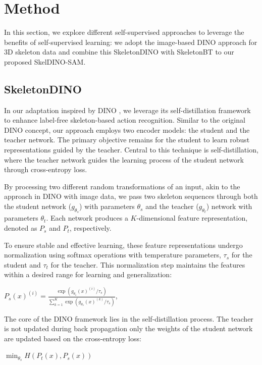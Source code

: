 \section{Method}
In this section, we explore different self-supervised approaches to leverage the benefits of self-supervised learning: we adopt the image-based DINO \cite{caron2021emerging} approach for 3D skeleton data and combine this SkeletonDINO with SkeletonBT \cite{zhou2023self} to our proposed SkelDINO-SAM. 

\subsection{SkeletonDINO}
In our adaptation inspired by DINO \cite{caron2021emerging}, we leverage its self-distillation framework to enhance label-free skeleton-based action recognition. 
Similar to the original DINO concept, our approach employs two encoder models: the student and the teacher network. The primary objective remains for the student to learn robust representations guided by the teacher. Central to this technique is self-distillation, where the teacher network guides the learning process of the student network through cross-entropy loss.

By processing two different random transformations of an input, akin to the approach in DINO with image data, we pass two skeleton sequences through both the student network ($g_{\theta_s}$) with parameters $\theta_s$ and the teacher ($g_{\theta_t}$) network with parameters $\theta_t$. Each network produces a $K$-dimensional feature representation, denoted as $P_s$ and $P_t$, respectively.

To ensure stable and effective learning, these feature representations undergo normalization using softmax operations with temperature parameters, $\tau_s$ for the student and $\tau_t$ for the teacher. This normalization step maintains the features within a desired range for learning and generalization:

\begin{center}
$P_s(x)^{(i)}=\frac{\exp \left(g_{\theta_s}(x)^{(i)} / \tau_s\right)}{\sum_{k=1}^K \exp \left(g_{\theta_s}(x)^{(k)} / \tau_s\right)}$,
\end{center}

The core of the DINO framework lies in the self-distillation process. The teacher is not updated during  back propagation only the weights of the student network are updated based on the cross-entropy loss:

\begin{center}
$\min _{\theta_s} H\left(P_t(x), P_s(x)\right)$
\end{center}


